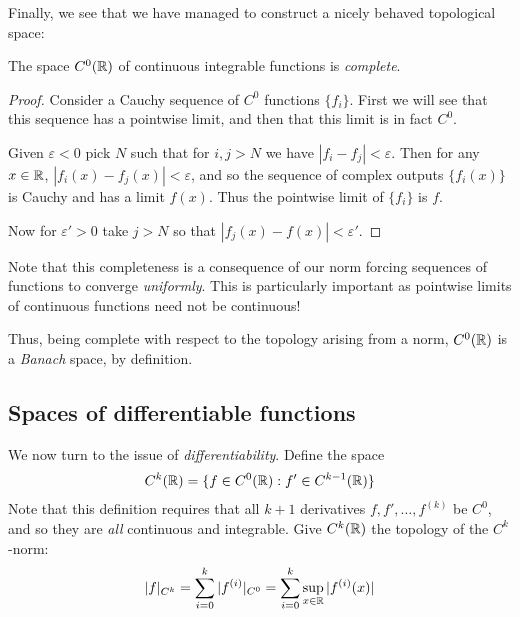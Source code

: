       Finally, we see that we have managed to construct a nicely behaved topological space:
      \begin{thm}
        The space $C^0(\mathbb{R})$ of continuous integrable functions is \emph{complete}.
        \begin{proof}
          Consider a Cauchy sequence of $C^0$ functions $\{f_i\}$.
          First we will see that this sequence has a pointwise limit, and then that this limit is in fact $C^0$.

          Given $\varepsilon<0$ pick $N$ such that for $i,j>N$ we have $|f_i-f_j|<\varepsilon$.
          Then for any $x\in\mathbb{R}$, $|f_i(x)-f_j(x)|<\varepsilon$, and so the sequence of complex outputs $\{f_i(x)\}$ is Cauchy and has a limit $f(x)$.
          Thus the pointwise limit of $\{f_i\}$ is $f$.
         
          Now for $\varepsilon'>0$ take $j>N$ so that $|f_j(x)-f(x)|<\varepsilon'$.
        \end{proof}
      \end{thm}
      \begin{rmk}
        Note that this completeness is a consequence of our norm forcing sequences of functions to converge \emph{uniformly}.
        This is particularly important as pointwise limits of continuous functions need not be continuous!
      \end{rmk}
      \begin{rmk}
        Thus, being complete with respect to the topology arising from a norm, $C^0(\mathbb{R})$ is a \emph{Banach} space, by definition.
      \end{rmk}

    \subsection{Spaces of differentiable functions}
      We now turn to the issue of \emph{differentiability}.
      Define the space 
      \begin{align*}
        C^k(\mathbb{R}) = \{f\in C^0(\mathbb{R}) : f'\in C^{k-1}(\mathbb{R})\}
      \end{align*}
      Note that this definition requires that all $k+1$ derivatives $f,f',\ldots,f^{(k)}$ be $C^0$, and so they are \emph{all} continuous and integrable.
      Give $C^k(\mathbb{R})$ the topology of the $C^k$-norm:
      \begin{align*}
        |f|_{C^k} = \sum_{i=0}^k |f^{(i)}|_{C^0} = \sum_{i=0}^k \sup_{x\in\mathbb{R}}|f^{(i)}(x)|
      \end{align*}
      \begin{rmk}
      \end{rmk}
      \begin{rmk}
      \end{rmk}
      \begin{claim}
      \end{claim}

